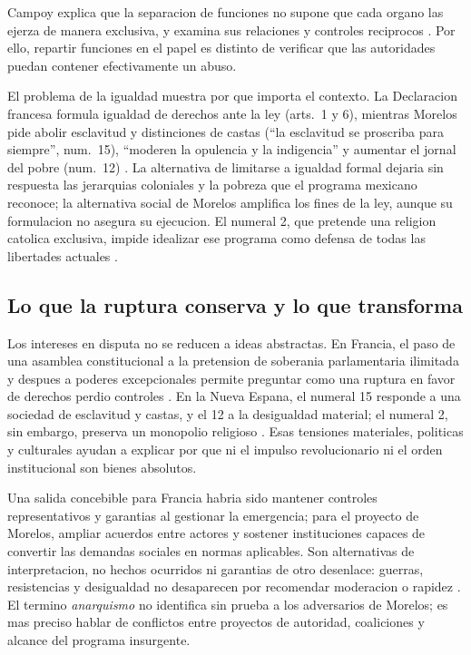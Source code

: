 \documentclass[spanish,letterpaper,oneside]{article}
\begin{document}
Campoy explica que la separacion de funciones no supone que cada
organo las ejerza de manera exclusiva, y examina sus relaciones y
controles reciprocos \citep[p.~100]{campoy2017}. Por ello, repartir
funciones en el papel es distinto de verificar que las autoridades
puedan contener efectivamente un abuso.

El problema de la igualdad muestra por que importa el contexto. La
Declaracion francesa formula igualdad de derechos ante la ley
(arts.~1 y 6), mientras Morelos pide abolir esclavitud y distinciones
de castas (``la esclavitud se proscriba para siempre'', num.~15),
``moderen la opulencia y la indigencia'' y aumentar el jornal del
pobre (num.~12) \citep{francia1789,morelos2020}. La
alternativa de limitarse a igualdad formal dejaria sin respuesta las
jerarquias coloniales y la pobreza que el programa mexicano reconoce;
la alternativa social de Morelos amplifica los fines de la ley, aunque
su formulacion no asegura su ejecucion. El numeral 2, que pretende una
religion catolica exclusiva, impide idealizar ese programa como defensa
de todas las libertades actuales \citep{morelos2020}.

\subsection{Lo que la ruptura conserva y lo que transforma}

Los intereses en disputa no se reducen a ideas abstractas. En Francia,
el paso de una asamblea constitucional a la pretension de soberania
parlamentaria ilimitada y despues a poderes excepcionales permite
preguntar como una ruptura en favor de derechos perdio controles
\citep[pp.~277, 280--283]{kriele2022}. En la Nueva Espana, el numeral
15 responde a una sociedad de esclavitud y castas, y el 12 a la
desigualdad material; el numeral 2, sin embargo, preserva un monopolio
religioso \citep{morelos2020}. Esas tensiones materiales, politicas y
culturales ayudan a explicar por que ni el impulso revolucionario ni el
orden institucional son bienes absolutos.

Una salida concebible para Francia habria sido mantener controles
representativos y garantias al gestionar la emergencia; para el proyecto
de Morelos, ampliar acuerdos entre actores y sostener instituciones
capaces de convertir las demandas sociales en normas aplicables. Son
alternativas de interpretacion, no hechos ocurridos ni garantias de otro
desenlace: guerras, resistencias y desigualdad no desaparecen por
recomendar moderacion o rapidez \citep{kriele2022,morelos2020}. El
termino \emph{anarquismo} no identifica sin prueba a los adversarios de
Morelos; es mas preciso hablar de conflictos entre proyectos de
autoridad, coaliciones y alcance del programa insurgente.
\end{document}

